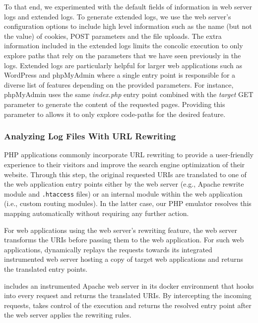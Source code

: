 To that end, we experimented with the default fields of information in web server logs and extended logs. 
To generate extended logs, we use the web server's configuration options to include high level information such as the name (but not the value) of cookies, POST parameters and the file uploads. 
The extra information included in the extended logs limits the concolic execution to only explore paths that rely on the parameters that we have seen previously in the logs. 
Extended logs are particularly helpful for larger web applications such as WordPress and phpMyAdmin where a single entry point is responsible for a diverse list of features depending on the provided parameters. 
For instance, phpMyAdmin uses the same \emph{index.php} entry point combined with the \emph{target} GET parameter to generate the content of the requested pages. 
Providing this parameter to \animatedead{} allows it to only explore code-paths for the desired feature. 

\subsubsection*{Analyzing Log Files With URL Rewriting} 
PHP applications commonly incorporate URL rewriting to provide a user-friendly experience to their visitors and improve the search engine optimization of their website. 
Through this step, the original requested URIs are translated to one of the web application entry points either by the web server (e.g., Apache rewrite module and \texttt{.htaccess} files) or an internal module within the web application (i.e., custom routing modules). 
In the latter case, our PHP emulator resolves this mapping automatically without requiring any further action. 

For web applications using the web server's rewriting feature, the web server transforms the URIs before passing them to the web application. 
For such web applications, \animatedead{} dynamically replays the requests towards its integrated instrumented web server hosting a copy of target web applications and returns the translated entry points. 

\animatedead{} includes an instrumented Apache web server in its docker environment that hooks into every request and returns the translated URIs. 
By intercepting the incoming requests, \animatedead{} takes control of the execution and returns the resolved entry point after the web server applies the rewriting rules.

